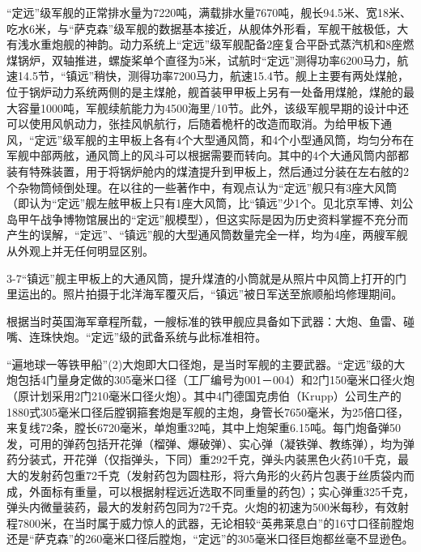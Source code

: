 \documentclass[12pt,UTF8]{ctexbook}
\begin{document}
“定远”级军舰的正常排水量为7220吨，满载排水量7670吨，舰长94.5米、宽18米、吃水6米，与“萨克森”级军舰的数据基本接近，从舰体外形看，军舰干舷极低，大有浅水重炮舰的神韵。动力系统上“定远”级军舰配备2座复合平卧式蒸汽机和8座燃煤锅炉，双轴推进，螺旋桨单个直径为5米，试航时“定远”测得功率6200马力，航速14.5节，“镇远”稍快，测得功率7200马力，航速15.4节。舰上主要有两处煤舱，位于锅炉动力系统两侧的是主煤舱，舰首装甲甲板上另有一处备用煤舱，煤舱的最大容量1000吨，军舰续航能力为4500海里/10节。此外，该级军舰早期的设计中还可以使用风帆动力，张挂风帆航行，后随着桅杆的改造而取消。为给甲板下通风，“定远”级军舰的主甲板上各有4个大型通风筒，和4个小型通风筒，均匀分布在军舰中部两舷，通风筒上的风斗可以根据需要而转向。其中的4个大通风筒内部都装有特殊装置，用于将锅炉舱内的煤渣提升到甲板上，然后通过分装在左右舷的2个杂物筒倾倒处理。在以往的一些著作中，有观点认为“定远”舰只有3座大风筒（即认为“定远”舰左舷甲板上只有1座大风筒，比“镇远”少1个。见北京军博、刘公岛甲午战争博物馆展出的“定远”舰模型），但这实际是因为历史资料掌握不充分而产生的误解，“定远”、“镇远”舰的大型通风筒数量完全一样，均为4座，两艘军舰从外观上并无任何明显区别。

3-7“镇远”舰主甲板上的大通风筒，提升煤渣的小筒就是从照片中风筒上打开的门里运出的。照片拍摄于北洋海军覆灭后，“镇远”被日军送至旅顺船坞修理期间。

根据当时英国海军章程所载，一艘标准的铁甲舰应具备如下武器：大炮、鱼雷、碰嘴、连珠快炮。“定远”级的武备系统与此标准相符。

“遍地球一等铁甲船”(2)大炮即大口径炮，是当时军舰的主要武器。“定远”级的大炮包括4门量身定做的305毫米口径（工厂编号为001－004）和2门150毫米口径火炮（原计划采用2门210毫米口径火炮）。其中4门德国克虏伯（Krupp）公司生产的1880式305毫米口径后膛钢箍套炮是军舰的主炮，身管长7650毫米，为25倍口径，来复线72条，膛长6720毫米，单炮重32吨，其中上炮架重6.15吨。每门炮备弹50发，可用的弹药包括开花弹（榴弹、爆破弹）、实心弹（凝铁弹、教练弹），均为弹药分装式，开花弹（仅指弹头，下同）重292千克，弹头内装黑色火药10千克，最大的发射药包重72千克（发射药包为圆柱形，将六角形的火药片包裹于丝质袋内而成，外面标有重量，可以根据射程远近选取不同重量的药包）；实心弹重325千克，弹头内微量装药，最大的发射药包同为72千克。火炮的初速为500米每秒，有效射程7800米，在当时属于威力惊人的武器，无论相较“英弗莱息白”的16寸口径前膛炮还是“萨克森”的260毫米口径后膛炮，“定远”的305毫米口径巨炮都丝毫不显逊色。
\end{document}
